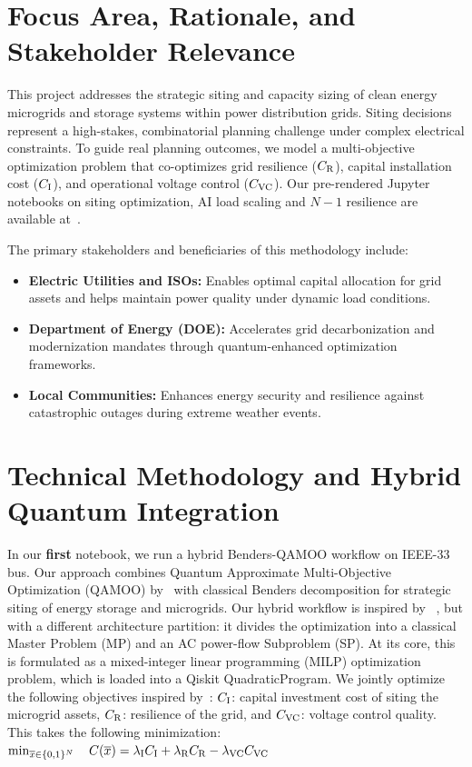 \documentclass[11pt]{article}
\begin{document}


\section{Focus Area, Rationale, and Stakeholder Relevance}
This project addresses the strategic siting and capacity sizing of clean energy microgrids and storage systems within power distribution grids. Siting decisions represent a high-stakes, combinatorial planning challenge under complex electrical constraints. To guide real planning outcomes, we model a multi-objective optimization problem that co-optimizes grid resilience ($C_{\rm R}$), capital installation cost ($C_{\rm I}$), and operational voltage control ($C_{\rm VC}$). Our pre-rendered Jupyter notebooks on siting optimization, AI load scaling and $N-1$ resilience are available at~\cite{doe_notebook}.

The primary stakeholders and beneficiaries of this methodology include:
\begin{itemize}[leftmargin=*,noitemsep,topsep=0pt]
  \item \textbf{Electric Utilities and ISOs:} Enables optimal capital allocation for grid assets and helps maintain power quality under dynamic load conditions.
  \item \textbf{Department of Energy (DOE):} Accelerates grid decarbonization and modernization mandates through quantum-enhanced optimization frameworks.
  \item \textbf{Local Communities:} Enhances energy security and resilience against catastrophic outages during extreme weather events.
\end{itemize}

\section{Technical Methodology and Hybrid Quantum Integration}
In our \textbf{first} notebook, we run a hybrid Benders-QAMOO workflow on IEEE-33 bus. Our approach combines Quantum Approximate Multi-Objective Optimization (QAMOO) by~\cite{qamoo2025} with classical Benders decomposition for strategic siting of energy storage and microgrids. Our hybrid workflow is inspired by ~\cite{pasqal2024}, but with a different architecture partition: it divides the optimization into a classical Master Problem (MP) and an AC power-flow Subproblem (SP).
At its core, this is formulated as a mixed-integer linear programming (MILP) optimization problem, which is loaded into a Qiskit QuadraticProgram. We jointly optimize the following objectives inspired by~\cite{multiverse2023}: $C_{\rm I}$: capital investment cost of siting the microgrid assets, $C_{\rm R}$: resilience of the grid, and $C_{\rm VC}$: voltage control quality. This takes the following minimization:
$
\min_{\overline{x} \in \{0,1\}^N} \quad C(\overline{x}) = \lambda_{\rm I} C_{\rm I} + \lambda_{\rm R} C_{\rm R} - \lambda_{\rm VC} C_{\rm VC}
$
\end{document}
